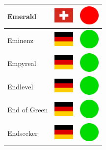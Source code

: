 \documentclass[12pt, a4paper, twoside]{report}
\begin{document}
\begin{center}
\begin{longtable}{|p{5cm}|p{2cm}|p{2cm}|}
Emerald & \includegraphics[width=1cm]{4x3/ch} & \includegraphics[width=1cm]{likes/n} \\ \hline
Eminenz & \includegraphics[width=1cm]{4x3/de} & \includegraphics[width=1cm]{likes/y} \\ \hline
Empyreal & \includegraphics[width=1cm]{4x3/de} & \includegraphics[width=1cm]{likes/y} \\ \hline
Endlevel & \includegraphics[width=1cm]{4x3/de} & \includegraphics[width=1cm]{likes/y} \\ \hline
End of Green & \includegraphics[width=1cm]{4x3/de} & \includegraphics[width=1cm]{likes/y} \\ \hline
Endseeker & \includegraphics[width=1cm]{4x3/de} & \includegraphics[width=1cm]{likes/y} \\ \hline

\end{longtable}
\end{center}
\end{document}
